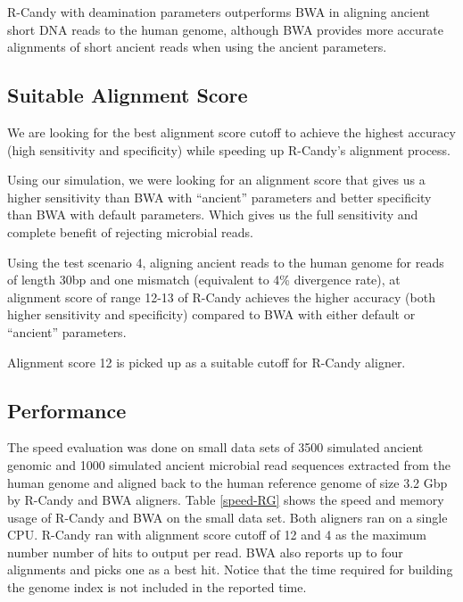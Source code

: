 \documentclass[11pt,a4paper]{report}
\newcommand{\quotes}[1]{``#1''}
\begin{document}
R-Candy with deamination parameters outperforms BWA in aligning ancient 
short DNA reads to the human genome, although 
BWA provides more accurate alignments of short 
ancient reads when using the ancient parameters. 
 



\subsection{Suitable Alignment Score} 
\label{Suitable Alignment Score}

We are looking for the best alignment score cutoff to achieve the 
highest accuracy (high sensitivity and specificity) while speeding 
up R-Candy's alignment process.

Using our simulation, we were looking for an alignment score that 
gives us a higher sensitivity than BWA with \quotes{ancient} parameters 
and better specificity than BWA with default parameters.
Which gives us the full sensitivity and complete benefit of rejecting
microbial reads. 

Using the test scenario 4, aligning ancient reads to the human
genome for reads of length 30bp and one mismatch (equivalent to 4\% 
divergence rate), at alignment score of range 12-13 of R-Candy 
achieves the higher accuracy (both higher sensitivity and 
specificity) compared to BWA with either default or \quotes{ancient} 
parameters.

Alignment score 12 is picked up as a suitable cutoff for R-Candy aligner. 


\subsection{Performance} \label{Performance}

The speed evaluation was done on small data sets of 3500 simulated ancient 
genomic and 1000 simulated ancient microbial read sequences extracted from
the human genome and aligned back to the human reference genome of size 3.2 
Gbp by R-Candy and BWA aligners.
Table \ref{speed-RG} shows the speed and memory usage of R-Candy and BWA on 
the small data set. Both aligners ran on a single CPU. 
R-Candy ran with alignment score cutoff of 12 and 4 as the maximum
number number of hits to output per read. BWA also reports up to four
alignments and picks one as a best hit.  Notice that the time required for
building the genome index is not included in the reported time.\\
\end{document}
